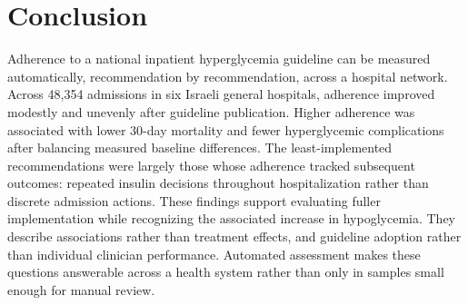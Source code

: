 \section{Conclusion}
\label{sec:conclusion}

Adherence to a national inpatient hyperglycemia guideline can be measured
automatically, recommendation by recommendation, across a hospital network.
Across 48,354 admissions in six Israeli general hospitals, adherence improved
modestly and unevenly after guideline publication. Higher adherence was
associated with lower 30-day mortality and fewer hyperglycemic complications
after balancing measured baseline differences. The least-implemented
recommendations were largely those whose adherence tracked subsequent
outcomes: repeated insulin decisions throughout hospitalization rather than
discrete admission actions. These findings support evaluating fuller
implementation while recognizing the associated increase in hypoglycemia.
They describe associations rather than treatment effects, and guideline
adoption rather than individual clinician performance. Automated assessment
makes these questions answerable across a health system rather than only in
samples small enough for manual review.
